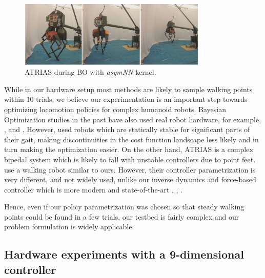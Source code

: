 \begin{figure}[t]
\centering
\includegraphics[width=0.8\textwidth]{img/atrias_walk_slides.jpg}
\caption{ATRIAS during BO with \textit{asymNN} kernel.}
\label{fig:bo_runs_atrias_hw_slides}
\end{figure}




While in our hardware setup most methods are likely to sample walking points within 10 trials, we believe our experimentation is an important step towards optimizing locomotion policies for complex humanoid robots. Bayesian Optimization studies in the past have also used real robot hardware, for example, \cite{Calandra2016}, \cite{cully2015robots} and \cite{tesch}.
However, \cite{tesch, lizotte2007automatic, cully2015robots} used robots which are statically stable for significant parts of their gait, making discontinuities in the cost function landscape less likely and in turn making the optimization easier. On the other hand, ATRIAS is a complex bipedal system which is likely to fall with unstable controllers due to point feet. \cite{Calandra2016} use a walking robot similar to ours. However, their controller parametrization is very different, and not widely used, unlike our inverse dynamics and force-based controller which is more modern and state-of-the-art \cite{kuindersma2016optimization}, \cite{herzog2016momentum}, \cite{feng2015optimization}. 

Hence, even if our policy parametrization was chosen so that steady walking points could be found in a few trials, our testbed is fairly complex and our problem formulation is widely applicable. 


\subsection{Hardware experiments with a 9-dimensional controller}

